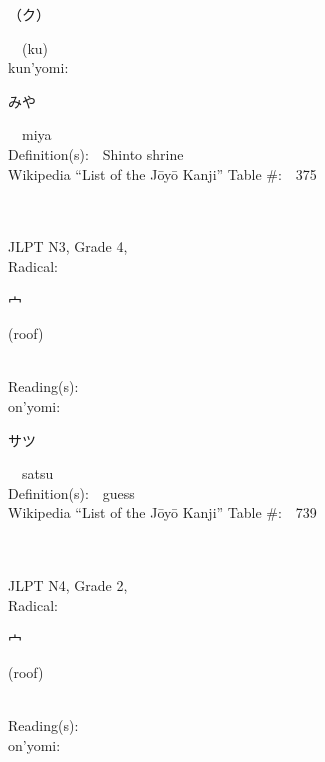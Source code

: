 \begin{multicols}{2}
{\hspace*{2em}}{\begin{CJK}{UTF8}{min} （ク） \end{CJK}}\ \ (ku)\ \ \\
{\hspace*{1em}}kun'yomi:\ \ \\
{\hspace*{2em}}{\begin{CJK}{UTF8}{min} みや \end{CJK}}\ \ miya\ \ \\
Definition(s):\ \ Shinto shrine \\
Wikipedia ``List of the J\=oy\=o Kanji'' Table \#:\ \ 375 \\
\ \ \\
{\fontsize{34pt}{40pt}  }\ \ \\  %
{JLPT N3, Grade 4, \\Radical:\ \ {\begin{CJK}{UTF8}{min} 宀 \end{CJK}} (roof) } \\
Reading(s):\ \ \\
{\hspace*{1em}}on'yomi:\ \ \\
{\hspace*{2em}}{\begin{CJK}{UTF8}{min} サツ \end{CJK}}\ \ satsu\ \ \\
Definition(s):\ \ guess \\
Wikipedia ``List of the J\=oy\=o Kanji'' Table \#:\ \ 739 \\
\ \ \\
{\fontsize{34pt}{40pt}  }\ \ \\  %
{JLPT N4, Grade 2, \\Radical:\ \ {\begin{CJK}{UTF8}{min} 宀 \end{CJK}} (roof) } \\
Reading(s):\ \ \\
{\hspace*{1em}}on'yomi:\ \ \\

\end{multicols}

